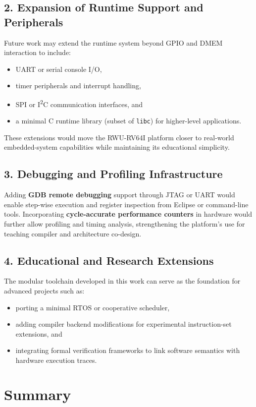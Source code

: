\subsection*{2. Expansion of Runtime Support and Peripherals}
Future work may extend the runtime system beyond GPIO and DMEM interaction to include:
\begin{itemize}
    \item UART or serial console I/O,
    \item timer peripherals and interrupt handling,
    \item SPI or I\textsuperscript{2}C communication interfaces, and
    \item a minimal C runtime library (subset of \texttt{libc}) for higher-level applications.
\end{itemize}
These extensions would move the RWU-RV64I platform closer to real-world embedded-system capabilities while maintaining its educational simplicity.

\subsection*{3. Debugging and Profiling Infrastructure}
Adding \textbf{GDB remote debugging} support through JTAG or UART would enable step-wise execution and register inspection from Eclipse or command-line tools.  
Incorporating \textbf{cycle-accurate performance counters} in hardware would further allow profiling and timing analysis, strengthening the platform’s use for teaching compiler and architecture co-design.


\subsection*{4. Educational and Research Extensions}
The modular toolchain developed in this work can serve as the foundation for advanced projects such as:
\begin{itemize}
    \item porting a minimal RTOS or cooperative scheduler,
    \item adding compiler backend modifications for experimental instruction-set extensions, and
    \item integrating formal verification frameworks to link software semantics with hardware execution traces.
\end{itemize}

\section{Summary}

